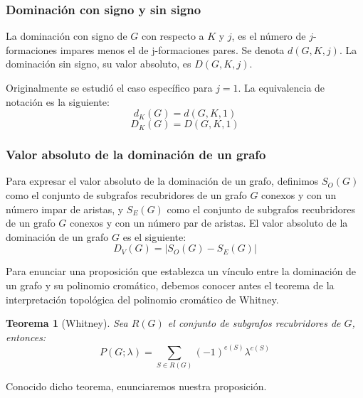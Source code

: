 \documentclass{article}
\newtheorem{thm}{Teorema}[section]
\numberwithin{figure}{section}
\begin{document}
\subsubsection{Dominación con signo y sin signo}

La dominación con signo de $G$ con respecto a $K$ y $j$, es el número de $j$-formaciones impares menos el de j-formaciones pares. Se denota $d(G, K, j)$. La dominación sin signo, su valor absoluto, es $D(G, K, j)$.

Originalmente se estudió el caso específico para $j=1$. La equivalencia de notación es la siguiente:
\begin{equation*}
    d_K(G) = d(G, K, 1)
\end{equation*}
\begin{equation*}
    D_K(G) = D(G, K, 1)
\end{equation*}

\subsubsection{Valor absoluto de la dominación de un grafo}

Para expresar el valor absoluto de la dominación de un grafo, definimos $S_O(G)$ como el conjunto de subgrafos recubridores de un grafo $G$ conexos y con un número impar de aristas, y $S_E(G)$ como el conjunto de subgrafos recubridores de un grafo $G$ conexos y con un número par de aristas. El valor absoluto de la dominación de un grafo $G$ es el siguiente:
\begin{equation*}
    D_V(G) = |S_O(G) - S_E(G)|
\end{equation*}

Para enunciar una proposición que establezca un vínculo entre la dominación de un grafo y su polinomio cromático, debemos conocer antes el teorema de la interpretación topológica del polinomio cromático de Whitney.

\begin{thm}[Whitney]
    Sea $R(G)$ el conjunto de subgrafos recubridores de $G$, entonces:
    \begin{equation*}
        P(G; \lambda) = \sum_{S \in R(G)} (-1)^{e(S)} \lambda^{c(S)}
    \end{equation*}
\end{thm}

Conocido dicho teorema, enunciaremos nuestra proposición.
\end{document}
